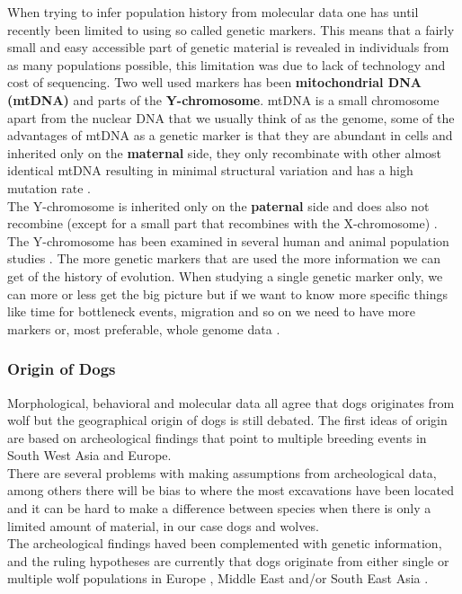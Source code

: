 
When trying to infer population history from molecular data one has until recently been limited to using so called genetic markers. This means that a fairly small and easy accessible part of genetic material is revealed in individuals from as many populations possible, this limitation was due to lack of technology and cost of sequencing. Two well used markers has been \textbf{mitochondrial DNA (mtDNA)} and parts of the \textbf{Y-chromosome}. mtDNA is a small chromosome apart from the nuclear DNA that we usually think of as the genome, some of the advantages of mtDNA as a genetic marker is that they are abundant in cells and inherited only on the \textbf{maternal} side, they only recombinate with other almost identical mtDNA resulting in minimal structural variation and has a high mutation rate \cite{cann87}.\\ 

The Y-chromosome is inherited only on the \textbf{paternal} side and does also not recombine (except for a small part that recombines with the X-chromosome) \cite{underhill07}. The Y-chromosome has been examined in several human \cite{jobling03,kayser01} and animal population studies \cite{ginja08,ling10}. The more genetic markers that are used the more information we can get of the history of evolution. When studying a single genetic marker only, we can more or less get the big picture but if we want to know more specific things like time for bottleneck events, migration and so on we need to have more markers or, most preferable, whole genome data \cite{stoneking11}.

\subsubsection{Origin of Dogs}

Morphological, behavioral and molecular data all agree that dogs originates from wolf \cite{clutton-brock95,vila97,wayne93} but the geographical origin of dogs is still debated. The first ideas of origin are based on archeological findings that point to multiple breeding events in South West Asia and Europe\cite{clutton-brock95,dayan94}.\\
There are several problems with making assumptions from archeological data, among others there will be bias to where the most excavations have been located and it can be hard to make a difference between species when there is only a limited amount of material, in our case dogs and wolves.\\
The archeological findings haved been complemented with genetic information, and the ruling hypotheses are currently that dogs originate from either single or multiple wolf populations in Europe \cite{benecke87,verginelli05}, Middle East \cite{gray10,vonholdt10} and/or South East Asia \cite{savo02, pang09, ding11}.\\

